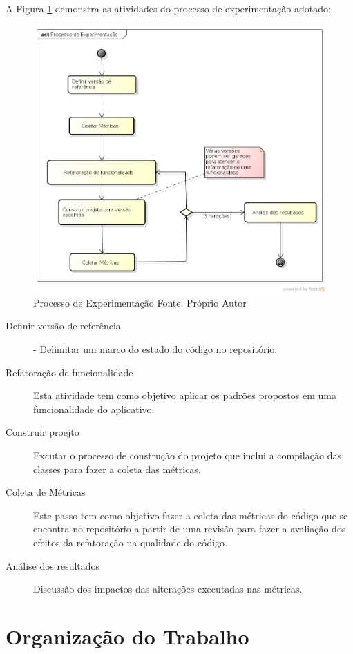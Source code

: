 A Figura \ref{processo_experimentacao} demonstra as atividades do processo de
experimentação adotado:
\begin{figure}[!h]
	\centering
	\includegraphics[scale=0.4]{img/processo_experimentacao.png}
	\caption{Processo de Experimentação Fonte: Próprio Autor}
	\label{processo_experimentacao}
\end{figure}

\begin{description}
\item[Definir versão de referência] - Delimitar um marco do estado do código no
repositório.
\item[Refatoração de funcionalidade] Esta atividade tem como objetivo aplicar os
padrões propostos em uma funcionalidade do aplicativo.
\item[Construir proejto] Excutar o processo de construção do projeto que inclui
a compilação das classes para fazer a coleta das métricas.
\item[Coleta de Métricas] Este passo tem como objetivo fazer a coleta
das métricas do código que se encontra no repositório a partir de uma revisão
para fazer a avaliação dos efeitos da refatoração na qualidade do código.
\item[Análise dos resultados] Discussão dos impactos das alterações executadas
nas métricas.
\end{description}


\section{Organização do Trabalho}


